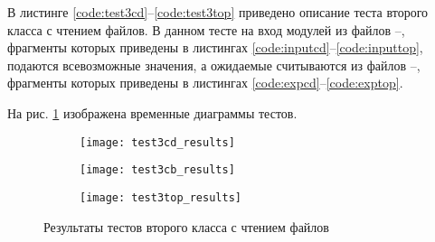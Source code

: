 В листинге \ref{code:test3cd}--\ref{code:test3top} приведено описание теста второго класса с чтением файлов. В данном тесте на вход модулей из файлов --, фрагменты которых приведены в листингах \ref{code:inputcd}--\ref{code:inputtop}, подаются всевозможные значения, а ожидаемые считываются из файлов --, фрагменты которых приведены в листингах \ref{code:expcd}--\ref{code:exptop}.



\begin{multicols}{2}
		
		
		
	
	
	
	
\end{multicols}

На рис. \ref{fig:test3_results} изображена временные диаграммы тестов.
\begin{figure}[H]
	\begin{subfigure}{\textwidth}
		\centering
		\texttt{[image: test3cd\_results]}
		\vspace{0.1cm}
	\end{subfigure}
	\begin{subfigure}{\textwidth}
		\centering
		\texttt{[image: test3cb\_results]}
		\vspace{0.1cm}
	\end{subfigure}
	\begin{subfigure}{\textwidth}
		\centering
		\texttt{[image: test3top\_results]}
	\end{subfigure}
	\caption{Результаты тестов второго класса с чтением файлов}
	\label{fig:test3_results}
\end{figure}

